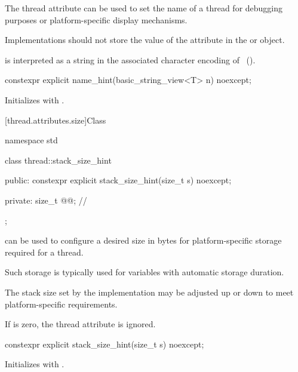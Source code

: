 \pnum
The  thread attribute can be used to set the name of a thread
for debugging purposes or platform-specific display mechanisms.

\recommended
Implementations should not store the value of the  attribute
in the  or  object.

\recommended
{} is interpreted as a string
in the associated character encoding
of ~().

%
\begin{itemdecl}
constexpr explicit name_hint(basic_string_view<T> n) noexcept;
\end{itemdecl}

\begin{itemdescr}
\pnum
\effects
Initializes  with .
\end{itemdescr}

[thread.attributes.size]{Class }

%
\begin{codeblock}
namespace std {
  class thread::stack_size_hint {
  public:
    constexpr explicit stack_size_hint(size_t s) noexcept;

  private:
    size_t @@;                // \expos
  };
}
\end{codeblock}

\pnum
{} can be used to configure a desired size in bytes
for platform-specific storage required for a thread.
\begin{note}
Such storage is typically used for variables with automatic storage duration.
\end{note}

\pnum
The stack size set by the implementation may be adjusted up or down
to meet platform-specific requirements.

\pnum
If  is zero, the thread attribute is ignored.

%
\begin{itemdecl}
constexpr explicit stack_size_hint(size_t s) noexcept;
\end{itemdecl}

\begin{itemdescr}
\pnum
\effects
Initializes  with .
\end{itemdescr}

